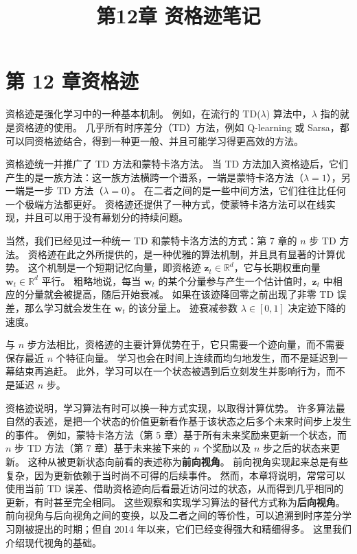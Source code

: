 \documentclass[UTF8,12pt,a4paper,fontset=fandol]{ctexart}
\title{第12章 资格迹笔记}
\author{}
\date{}
\begin{document}
\maketitle

\section*{第 12 章\quad 资格迹}

资格迹是强化学习中的一种基本机制。
例如，在流行的 TD($\lambda$) 算法中，$\lambda$ 指的就是资格迹的使用。
几乎所有时序差分（TD）方法，例如 Q-learning 或 Sarsa，都可以同资格迹结合，得到一种更一般、并且可能学习得更高效的方法。

资格迹统一并推广了 TD 方法和蒙特卡洛方法。
当 TD 方法加入资格迹后，它们产生的是一族方法：这一族方法横跨一个谱系，一端是蒙特卡洛方法（$\lambda=1$），另一端是一步 TD 方法（$\lambda=0$）。
在二者之间的是一些中间方法，它们往往比任何一个极端方法都更好。
资格迹还提供了一种方式，使蒙特卡洛方法可以在线实现，并且可以用于没有幕划分的持续问题。

当然，我们已经见过一种统一 TD 和蒙特卡洛方法的方式：第 7 章的 $n$ 步 TD 方法。
资格迹在此之外所提供的，是一种优雅的算法机制，并且具有显著的计算优势。
这个机制是一个短期记忆向量，即资格迹 $\mathbf{z}_t\in\mathbb{R}^d$，它与长期权重向量 $\mathbf{w}_t\in\mathbb{R}^d$ 平行。
粗略地说，每当 $\mathbf{w}_t$ 的某个分量参与产生一个估计值时，$\mathbf{z}_t$ 中相应的分量就会被提高，随后开始衰减。
如果在该迹降回零之前出现了非零 TD 误差，那么学习就会发生在 $\mathbf{w}_t$ 的该分量上。
迹衰减参数 $\lambda\in[0,1]$ 决定迹下降的速度。

与 $n$ 步方法相比，资格迹的主要计算优势在于，它只需要一个迹向量，而不需要保存最近 $n$ 个特征向量。
学习也会在时间上连续而均匀地发生，而不是延迟到一幕结束再追赶。
此外，学习可以在一个状态被遇到后立刻发生并影响行为，而不是延迟 $n$ 步。

资格迹说明，学习算法有时可以换一种方式实现，以取得计算优势。
许多算法最自然的表述，是把一个状态的价值更新看作基于该状态之后多个未来时间步上发生的事件。
例如，蒙特卡洛方法（第 5 章）基于所有未来奖励来更新一个状态，而 $n$ 步 TD 方法（第 7 章）基于未来接下来的 $n$ 个奖励以及 $n$ 步之后的状态来更新。
这种从被更新状态向前看的表述称为\textbf{前向视角}。
前向视角实现起来总是有些复杂，因为更新依赖于当时尚不可得的后续事件。
然而，本章将说明，常常可以使用当前 TD 误差、借助资格迹向后看最近访问过的状态，从而得到几乎相同的更新，有时甚至完全相同。
这些观察和实现学习算法的替代方式称为\textbf{后向视角}。
前向视角与后向视角之间的变换，以及二者之间的等价性，可以追溯到时序差分学习刚被提出的时期；但自 2014 年以来，它们已经变得强大和精细得多。
这里我们介绍现代视角的基础。
\end{document}
